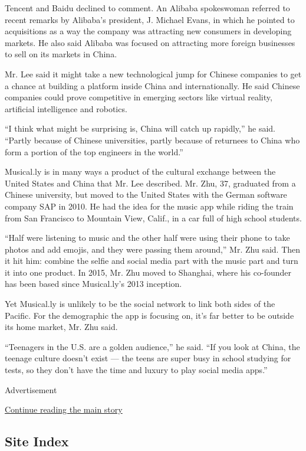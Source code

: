 Tencent and Baidu declined to comment. An Alibaba spokeswoman referred
to recent remarks by Alibaba's president, J. Michael Evans, in which he
pointed to acquisitions as a way the company was attracting new
consumers in developing markets. He also said Alibaba was focused on
attracting more foreign businesses to sell on its markets in China.

Mr. Lee said it might take a new technological jump for Chinese
companies to get a chance at building a platform inside China and
internationally. He said Chinese companies could prove competitive in
emerging sectors like virtual reality, artificial intelligence and
robotics.

``I think what might be surprising is, China will catch up rapidly,'' he
said. ``Partly because of Chinese universities, partly because of
returnees to China who form a portion of the top engineers in the
world.''

Musical.ly is in many ways a product of the cultural exchange between
the United States and China that Mr. Lee described. Mr. Zhu, 37,
graduated from a Chinese university, but moved to the United States with
the German software company SAP in 2010. He had the idea for the music
app while riding the train from San Francisco to Mountain View, Calif.,
in a car full of high school students.

``Half were listening to music and the other half were using their phone
to take photos and add emojis, and they were passing them around,'' Mr.
Zhu said. Then it hit him: combine the selfie and social media part with
the music part and turn it into one product. In 2015, Mr. Zhu moved to
Shanghai, where his co-founder has been based since Musical.ly's 2013
inception.

Yet Musical.ly is unlikely to be the social network to link both sides
of the Pacific. For the demographic the app is focusing on, it's far
better to be outside its home market, Mr. Zhu said.

``Teenagers in the U.S. are a golden audience,'' he said. ``If you look
at China, the teenage culture doesn't exist --- the teens are super busy
in school studying for tests, so they don't have the time and luxury to
play social media apps.''

Advertisement

\protect\hyperlink{after-bottom}{Continue reading the main story}

\hypertarget{site-index}{%
\subsection{Site Index}\label{site-index}}

